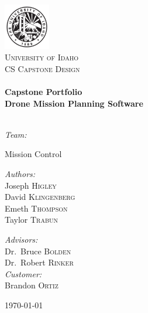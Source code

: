 
\begin{titlepage}
\begin{center}

\includegraphics[width=0.15\textwidth]{./icons/04UI_Seal-Black.jpg}~\\[1cm]

\textsc{\LARGE University of Idaho}\\[1.5cm]

\textsc{\Large CS Capstone Design}\\[0.5cm]

\HRule \\[0.4cm]
{ \huge \bfseries Capstone Portfolio \\[0.4cm] }
{ \huge \bfseries Drone Mission Planning Software \\[0.4cm] }
\HRule \\[1.5cm]
\centerline{\emph{Team:}}
\centerline{Mission Control}
\noindent
\begin{minipage}{0.4\textwidth}
\begin{flushleft} \large
\emph{Authors:}\\
Joseph \textsc{Higley}\\
David \textsc{Klingenberg}\\
Emeth \textsc{Thompson}\\
Taylor \textsc{Trabun}\\
\end{flushleft}
\end{minipage}%
\begin{minipage}{0.4\textwidth}
\begin{flushright} \large
\vspace{20pt}
\emph{Advisors:} \\
Dr.~Bruce \textsc{Bolden}\\
Dr.~Robert \textsc{Rinker}\\
\vspace{10pt}
\emph{Customer:}\\
Brandon \textsc{Ortiz}
\end{flushright}
\end{minipage}

\vfill

{\large \today}

\end{center}
\end{titlepage}